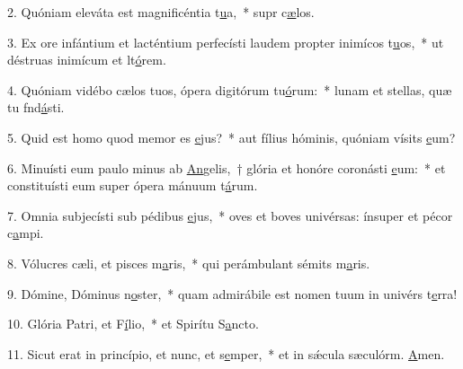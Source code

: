 2. Quóniam eleváta est magnificéntia t\uline{u}a,~* supr c\uline{æ}los.\par 
3. Ex ore infántium et lacténtium perfecísti laudem propter inimícos t\uline{u}os,~* ut déstruas inimícum et lt\uline{ó}rem.\par 
4. Quóniam vidébo cælos tuos, ópera digitórum tu\uline{ó}rum:~* lunam et stellas, quæ tu fnd\uline{á}sti.\par 
5. Quid est homo quod memor es \uline{e}jus?~* aut fílius hóminis, quóniam vísits \uline{e}um?\par 
6. Minuísti eum paulo minus ab \uline{An}gelis,~† glória et honóre coronásti \uline{e}um:~* et constituísti eum super ópera mánuum t\uline{á}rum.\par 
7. Omnia subjecísti sub pédibus \uline{e}jus,~* oves et boves univérsas: ínsuper et pécor c\uline{a}mpi.\par 
8. Vólucres cæli, et pisces m\uline{a}ris,~* qui perámbulant sémits m\uline{a}ris.\par 
9. Dómine, Dóminus n\uline{o}ster,~* quam admirábile est nomen tuum in univérs t\uline{e}rra!\par 
10. Glória Patri, et F\uline{í}lio,~* et Spirítu S\uline{a}ncto.\par 
11. Sicut erat in princípio, et nunc, et s\uline{e}mper,~* et in sǽcula sæculórm. \uline{A}men.\par 
